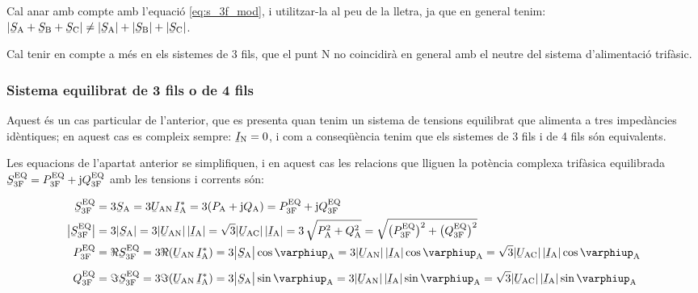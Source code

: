Cal anar amb compte amb l'equació \eqref{eq:s_3f_mod}, i utilitzar-la al
peu de la lletra, ja
que en general tenim: $|\cmplx{S}\ped{A} + \cmplx{S}\ped{B} + \cmplx{S}\ped{C}| \neq
|\cmplx{S}\ped{A}| + |\cmplx{S}\ped{B}| + |\cmplx{S}\ped{C}|$.

Cal tenir en compte a més en els sistemes de 3 fils, que el punt
N no coincidirà en general amb el neutre del sistema
d'alimentació trifàsic.

\subsubsection{Sistema equilibrat de 3 fils o de 4 fils}

Aquest és un cas particular de l'anterior, que es presenta quan
tenim un sistema de tensions equilibrat que alimenta a tres
impedàncies idèntiques; en aquest cas es compleix sempre:
$\cmplx{I}\ped{N}=0$, i com a conseqüència tenim que els sistemes de 3
fils i de 4 fils són equivalents.

Les equacions de l'apartat anterior se simplifiquen, i en aquest
cas les relacions que lliguen la  potència complexa trifàsica
equilibrada $\cmplx{S}\ped{3F}\ap{EQ} = P\ped{3F}\ap{EQ} + \ju
Q\ped{3F}\ap{EQ}$ amb les tensions i corrents són:

\begin{align}
    \cmplx{S}\ped{3F}\ap{EQ} &= 3\cmplx{S}\ped{A} = 3\cmplx{U}\ped{AN}\, \cmplx{I}\ped{A}^* =
    3 (P\ped{A} + \ju Q\ped{A}) = P\ped{3F}\ap{EQ} +\ju Q\ped{3F}\ap{EQ} \label{eq:s_3f_eq}\\
    \big|\cmplx{S}\ped{3F}\ap{EQ}\big| &= 3|\cmplx{S}\ped{A} | =   3 |\cmplx{U}\ped{AN}| \,|\cmplx{I}\ped{A}| =
    \sqrt{3} |\cmplx{U}\ped{AC}|\, |\cmplx{I}\ped{A}| = 3\,\sqrt{P\ped{A}^2 + Q\ped{A}^2} =
    \sqrt{\big(P\ped{3F}\ap{EQ}\big)^2 + \big(Q\ped{3F}\ap{EQ}\big)^2} \\
    P\ped{3F}\ap{EQ} &= \Re\cmplx{S}\ped{3F}\ap{EQ} =3\Re(\cmplx{U}\ped{AN} \,\cmplx{I}\ped{A}^*) =
    3\big|\cmplx{S}\ped{A}\big| \cos \varphiup\ped{A} = 3 |\cmplx{U}\ped{AN}|\,
    |\cmplx{I}\ped{A}|\label{eq:p_3f_34}
    \cos \varphiup\ped{A} = \sqrt{3} |\cmplx{U}\ped{AC}|\,|\cmplx{I}\ped{A}| \cos \varphiup\ped{A} \\[2mm]
    Q\ped{3F}\ap{EQ} &= \Im\cmplx{S}\ped{3F}\ap{EQ}= 3\Im(\cmplx{U}\ped{AN}\, \cmplx{I}\ped{A}^*) =
    3\big|\cmplx{S}\ped{A}\big|  \sin \varphiup\ped{A} = 3 |\cmplx{U}\ped{AN}| \, |\cmplx{I}\ped{A}|\label{eq:q_3f_34}
    \sin\varphiup\ped{A}=\sqrt{3} |\cmplx{U}\ped{AC}|\,|\cmplx{I}\ped{A}|\sin \varphiup\ped{A}
\end{align}


